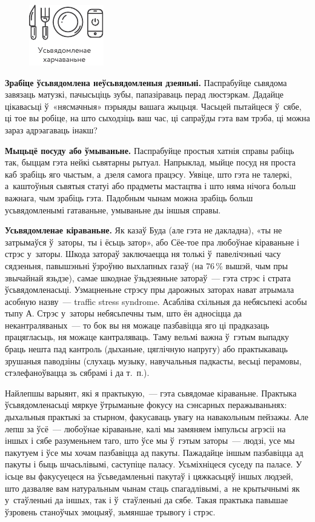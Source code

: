 \begin{figure}[htb!]
  \centering
  \includegraphics[scale=1.5]{willpower/ch8/7.pdf}
\end{figure}

\textbf{Зрабіце ўсьвядомлена неўсьвядомленыя дзеяньні.} Паспрабуйце сьвядома завязаць матузкі, пачысьціць зубы, папазіраваць перад люстэркам. Дадайце цікавасьці ў~«нясмачныя» пэрыяды вашага жыцьця. Часьцей пытайцеся ў~сябе, ці тое вы робіце, на што сыходзіць ваш час, ці сапраўды гэта вам трэба, ці можна зараз адрэагаваць інакш?

\textbf{Мыцьцё посуду або ўмываньне.} Паспрабуйце простыя хатнія справы рабіць так, быццам гэта нейкі сьвятарны рытуал. Напрыклад, мыйце посуд ня проста каб зрабіць яго чыстым, а~дзеля самога працэсу. Уявіце, што гэта не талеркі, а~каштоўныя сьвятыя статуі або прадметы мастацтва і што няма нічога больш важнага, чым зрабіць гэта. Падобным чынам можна зрабіць больш усьвядомленымі гатаваньне, умываньне ды іншыя справы.

\textbf{Усьвядомленае кіраваньне.} Як казаў Буда (але гэта не дакладна), «ты не затрымаўся ў~заторы, ты і ёсьць затор», або Сёе-тое пра любоўнае кіраваньне і стрэс у~заторы. Шкода затораў заключаецца ня толькі ў~павелічэньні часу сядзеньня, павышэньні ўзроўню выхлапных газаў (на 76\,\% вышэй, чым пры звычайнай язьдзе), самае шкоднае ўзьдзеяньне затораў~--- гэта стрэс і страта ўсьвядомленасьці. Узмацненьне стрэсу пры дарожных заторах нават атрымала асобную назву~--- traffic stress syndrome. Асабліва схільныя да небясьпекі асобы тыпу А. Стрэс у~заторы небясьпечны тым, што ён адносіцца да некантраляваных~--- то бок вы ня можаце пазбавіцца яго ці прадказаць працягласьць, ня можаце кантраляваць. Таму вельмі важна ў~гэтым выпадку браць нешта пад кантроль (дыханьне, цяглічную напругу) або практыкаваць зрушаныя паводзіны (слухаць музыку, навучальныя падкасты, весьці перамовы, стэлефаноўвацца зь сябрамі і да т.~п.).

Найлепшы варыянт, які я практыкую,~--- гэта сьвядомае кіраваньне. Практыка ўсьвядомленасьці мяркуе ўтрыманьне фокусу на сэнсарных перажываньнях: дыхальныя практыкі за стырном, факусаваць увагу на навакольным пейзажы. Але лепш за ўсё~--- любоўнае кіраваньне, калі мы замяняем імпульсы агрэсіі на іншых і сябе разуменьнем таго, што ўсе мы ў~гэтым заторы~--- людзі, усе мы пакутуем і ўсе мы хочам пазбавіцца ад пакуты. Пажадайце іншым пазбавіцца ад пакуты і быць шчасьлівымі, саступіце паласу. Усьміхніцеся суседу па паласе. У ісьце вы факусуецеся на ўсьведамленьні пакутаў і цяжкасьцяў іншых людзей, што дазваляе вам натуральным чынам стаць спагадлівымі, а~не крытычнымі як у~стаўленьні да іншых, так і ў~стаўленьні да сябе. Такая практыка павышае ўзровень станоўчых эмоцыяў, зьмяншае трывогу і стрэс.

